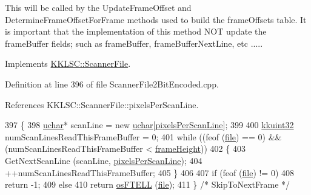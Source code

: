 This will be called by the \textquotesingle{}Update\+Frame\+Offset\textquotesingle{} and \textquotesingle{}Determine\+Frame\+Offset\+For\+Frame\textquotesingle{} methods used to build the \textquotesingle{}frame\+Offsets\textquotesingle{} table. It is important that the implementation of this method N\+OT update the frame\+Buffer fields; such as \textquotesingle{}frame\+Buffer\textquotesingle{}, \textquotesingle{}frame\+Buffer\+Next\+Line\textquotesingle{}, etc ..... 

Implements \hyperlink{class_k_k_l_s_c_1_1_scanner_file_a1797e4ba35b312c53da2c453f1303f35}{K\+K\+L\+S\+C\+::\+Scanner\+File}.



Definition at line 396 of file Scanner\+File2\+Bit\+Encoded.\+cpp.



References K\+K\+L\+S\+C\+::\+Scanner\+File\+::pixels\+Per\+Scan\+Line.


\begin{DoxyCode}
397 \{
398   \hyperlink{namespace_k_k_b_ace9969169bf514f9ee6185186949cdf7}{uchar}*  scanLine = \textcolor{keyword}{new} \hyperlink{namespace_k_k_b_ace9969169bf514f9ee6185186949cdf7}{uchar}[\hyperlink{class_k_k_l_s_c_1_1_scanner_file_a07b4ac6b33c35ad0148c7a1422c73cfe}{pixelsPerScanLine}];
399 
400   \hyperlink{namespace_k_k_b_af8d832f05c54994a1cce25bd5743e19a}{kkuint32}  numScanLinesReadThisFrameBuffer = 0;
401   \textcolor{keywordflow}{while}  ((feof (\hyperlink{class_k_k_l_s_c_1_1_scanner_file_a26db15f7823ce67b1621da17468ec807}{file}) == 0)  &&  (numScanLinesReadThisFrameBuffer < 
      \hyperlink{class_k_k_l_s_c_1_1_scanner_file_a5598193d137fb79782cc1967ec830625}{frameHeight}))
402   \{
403     GetNextScanLine (scanLine, \hyperlink{class_k_k_l_s_c_1_1_scanner_file_a07b4ac6b33c35ad0148c7a1422c73cfe}{pixelsPerScanLine});
404     ++numScanLinesReadThisFrameBuffer;
405   \}
406 
407   \textcolor{keywordflow}{if}  (feof (\hyperlink{class_k_k_l_s_c_1_1_scanner_file_a26db15f7823ce67b1621da17468ec807}{file}) != 0)
408     \textcolor{keywordflow}{return} -1;
409   \textcolor{keywordflow}{else}
410     \textcolor{keywordflow}{return} \hyperlink{namespace_k_k_b_a2cc11a5ae09d10d69ad751b549e5d94e}{osFTELL} (\hyperlink{class_k_k_l_s_c_1_1_scanner_file_a26db15f7823ce67b1621da17468ec807}{file});
411 \}  \textcolor{comment}{/* SkipToNextFrame */}
\end{DoxyCode}
